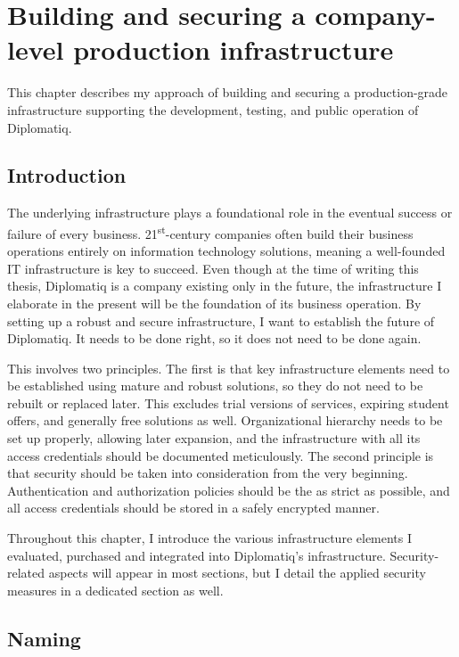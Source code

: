 \chapter{Building and securing a company-level production infrastructure}
\label{chapter:infrastructure}

This chapter describes my approach of building and securing a production-grade infrastructure supporting the development, testing, and public operation of Diplomatiq.

\section{Introduction}

The underlying infrastructure plays a foundational role in the eventual success or failure of every business. 21\textsuperscript{st}-century companies often build their business operations entirely on information technology solutions, meaning a well-founded IT infrastructure is key to succeed. Even though at the time of writing this thesis, Diplomatiq is a company existing only in the future, the infrastructure I elaborate in the present will be the foundation of its business operation. By setting up a robust and secure infrastructure, I want to establish the future of Diplomatiq. It needs to be done right, so it does not need to be done again.

This involves two principles. The first is that key infrastructure elements need to be established using mature and robust solutions, so they do not need to be rebuilt or replaced later. This excludes trial versions of services, expiring student offers, and generally free solutions as well. Organizational hierarchy needs to be set up properly, allowing later expansion, and the infrastructure with all its access credentials should be documented meticulously. The second principle is that security should be taken into consideration from the very beginning. Authentication and authorization policies should be the as strict as possible, and all access credentials should be stored in a safely encrypted manner.

Throughout this chapter, I introduce the various infrastructure elements I evaluated, purchased and integrated into Diplomatiq's infrastructure. Security-related aspects will appear in most sections, but I detail the applied security measures in a dedicated section as well.

\section{Naming}

